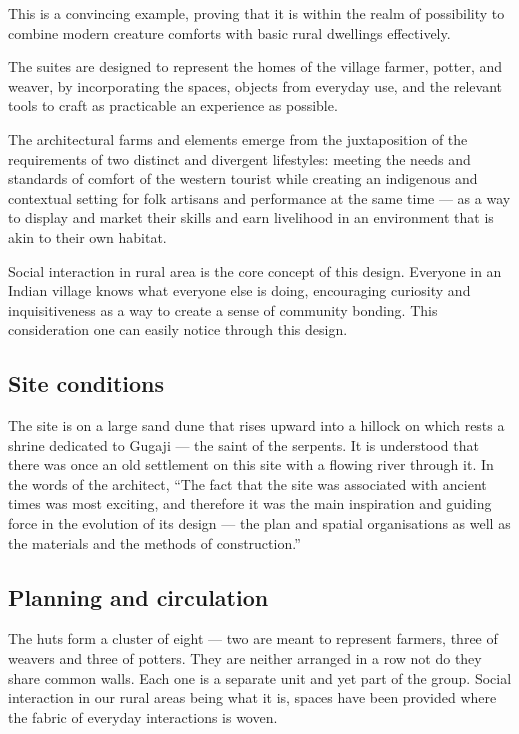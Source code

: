 This is a convincing example, proving that it is within the realm of possibility to combine modern creature comforts with basic rural dwellings effectively.

The suites are designed to represent the homes of the village farmer, potter, and weaver, by incorporating the spaces, objects from everyday use, and the relevant tools to craft as practicable an experience as possible.

The architectural farms and elements emerge from the juxtaposition of the requirements of two distinct and divergent lifestyles: meeting the needs and standards of comfort of the western tourist while creating an indigenous and contextual setting for folk artisans and performance at the same time --- as a way to display and market their skills and earn livelihood in an environment that is akin to their own habitat.

Social interaction in rural area is the core concept of this design. Everyone in an Indian village knows what everyone else is doing, encouraging curiosity and inquisitiveness as a way to create a sense of community bonding. This consideration one can easily notice through this design.


\subsection{Site conditions} %
\label{sub:dcm_sitecond}

The site is on a large sand dune that rises upward into a hillock on which rests a shrine dedicated to Gugaji --- the saint of the serpents. It is understood that there was once an old settlement on this site with a flowing river through it. In the words of the architect, ``The fact that the site was associated with ancient times was most exciting, and therefore it was the main inspiration and guiding force in the evolution of its design --- the plan and spatial organisations as well as the materials and the methods of construction.''


\subsection{Planning and circulation} %
\label{sub:dcm_planning}

The huts form a cluster of eight --- two are meant to represent farmers, three of weavers and three of potters. They are neither arranged in a row not do they share common walls. Each one is a separate unit and yet part of the group. Social interaction in our rural areas being what it is, spaces have been provided where the fabric of everyday interactions is woven.

